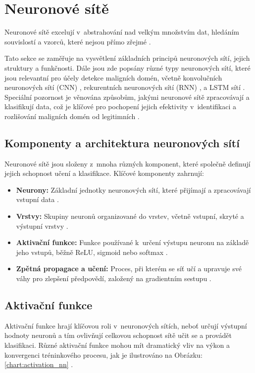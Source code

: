 \section{Neuronové sítě}

Neuronové sítě excelují v~abstrahování nad velkým množstvím dat, hledáním souvislostí a vzorců, které nejsou přímo zřejmé \cite{LeCun2015}.

Tato sekce se zaměřuje na vysvětlení základních principů neuronových sítí, jejich struktury a funkčnosti. Dále jsou zde popsány různé typy neuronových sítí, které jsou relevantní pro účely detekce maligních domén, včetně konvolučních neuronových sítí (CNN) \cite{lecun1998gradient}, rekurentních neuronových sítí (RNN) \cite{goodfellow2016deep}, a LSTM sítí \cite{hochreiter1997lstm}. Speciální pozornost je věnována způsobům, jakými neuronové sítě zpracovávají a klasifikují data, což je klíčové pro pochopení jejich efektivity v~identifikaci a rozlišování maligních domén od legitimních \cite{torroledo2018hunting}.

\subsection{Komponenty a architektura neuronových sítí}

Neuronové sítě jsou složeny z~mnoha různých komponent, které společně definují jejich schopnost učení a klasifikace. Klíčové komponenty zahrnují:

\begin{itemize}
    \item \textbf{Neurony:} Základní jednotky neuronových sítí, které přijímají a zpracovávají vstupní data \cite{goodfellow2016deep}.
    \item \textbf{Vrstvy:} Skupiny neuronů organizované do vrstev, včetně vstupní, skryté a výstupní vrstvy \cite{LeCun2015}.
    \item \textbf{Aktivační funkce:} Funkce používané k~určení výstupu neuronu na základě jeho vstupů, běžně ReLU, sigmoid nebo softmax \cite{goodfellow2016deep}.
    \item \textbf{Zpětná propagace a učení:} Proces, při kterém se síť učí a upravuje své váhy pro zlepšení předpovědí, založený na gradientním sestupu \cite{goodfellow2016deep}.
\end{itemize}


\subsection{Aktivační funkce}
Aktivační funkce hrají klíčovou roli v~neuronových sítích, neboť určují výstupní hodnoty neuronů a tím ovlivňují celkovou schopnost sítě učit se a provádět klasifikaci. Různé aktivační funkce mohou mít dramatický vliv na výkon a konvergenci tréninkového procesu, jak je ilustrováno na Obrázku: \ref{chart:activation_nn} \cite{ml_general}.


